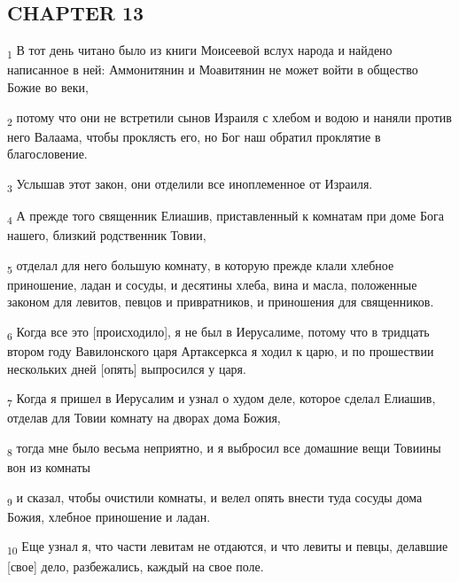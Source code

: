\subsection{CHAPTER 13}
\begin{tcolorbox}
\textsubscript{1} В тот день читано было из книги Моисеевой вслух народа и найдено написанное в ней: Аммонитянин и Моавитянин не может войти в общество Божие во веки,
\end{tcolorbox}
\begin{tcolorbox}
\textsubscript{2} потому что они не встретили сынов Израиля с хлебом и водою и наняли против него Валаама, чтобы проклясть его, но Бог наш обратил проклятие в благословение.
\end{tcolorbox}
\begin{tcolorbox}
\textsubscript{3} Услышав этот закон, они отделили все иноплеменное от Израиля.
\end{tcolorbox}
\begin{tcolorbox}
\textsubscript{4} А прежде того священник Елиашив, приставленный к комнатам при доме Бога нашего, близкий родственник Товии,
\end{tcolorbox}
\begin{tcolorbox}
\textsubscript{5} отделал для него большую комнату, в которую прежде клали хлебное приношение, ладан и сосуды, и десятины хлеба, вина и масла, положенные законом для левитов, певцов и привратников, и приношения для священников.
\end{tcolorbox}
\begin{tcolorbox}
\textsubscript{6} Когда все это [происходило], я не был в Иерусалиме, потому что в тридцать втором году Вавилонского царя Артаксеркса я ходил к царю, и по прошествии нескольких дней [опять] выпросился у царя.
\end{tcolorbox}
\begin{tcolorbox}
\textsubscript{7} Когда я пришел в Иерусалим и узнал о худом деле, которое сделал Елиашив, отделав для Товии комнату на дворах дома Божия,
\end{tcolorbox}
\begin{tcolorbox}
\textsubscript{8} тогда мне было весьма неприятно, и я выбросил все домашние вещи Товиины вон из комнаты
\end{tcolorbox}
\begin{tcolorbox}
\textsubscript{9} и сказал, чтобы очистили комнаты, и велел опять внести туда сосуды дома Божия, хлебное приношение и ладан.
\end{tcolorbox}
\begin{tcolorbox}
\textsubscript{10} Еще узнал я, что части левитам не отдаются, и что левиты и певцы, делавшие [свое] дело, разбежались, каждый на свое поле.
\end{tcolorbox}
